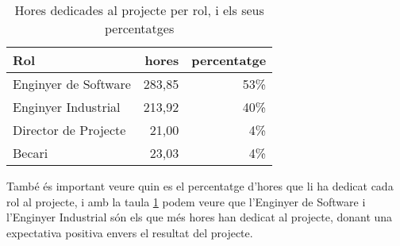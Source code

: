 \begin{table}[ht!]
\begin{center}
	\begin{tabular}{|| l | r | r ||}
\hline
\textbf{Rol} 	&\textbf{hores}	&\textbf{percentatge}\\
\hline
\hline
Enginyer de Software	&283,85	&53\%\\
\hline
Enginyer Industrial	&213,92	&40\%\\
\hline
Director de Projecte	&21,00	&4\%\\
\hline
Becari	&23,03	&4\%\\
\hline
	\end{tabular}
	\end{center}
	\caption[Hores dedicades per rol]{Hores dedicades al projecte per rol, i els seus percentatges}
	\label{tab:hores:rol}
\end{table}


També és important veure quin es el percentatge d'hores que li ha dedicat cada rol al projecte, i amb la taula \ref{tab:hores:rol} podem veure que l'Enginyer de Software i l'Enginyer Industrial són els que més hores han dedicat al projecte, donant una expectativa positiva envers el resultat del projecte.


